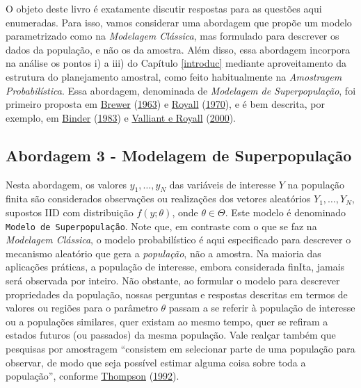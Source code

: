 \documentclass[
  12pt,
  brazilian,
]{book}
\theoremstyle{definition}
\theoremstyle{definition}
\theoremstyle{definition}
\theoremstyle{definition}
\theoremstyle{remark}
\begin{document}
O objeto deste livro é exatamente discutir respostas para as questões aqui
enumeradas. Para isso, vamos considerar uma abordagem que propõe um modelo
parametrizado como na \emph{Modelagem Clássica}, mas formulado para descrever os
dados da população, e não os da amostra. Além disso, essa abordagem incorpora na
análise os pontos i) a iii) do Capítulo \ref{introduc} mediante aproveitamento
da estrutura do planejamento amostral, como feito habitualmente na \emph{Amostragem
Probabilística}. Essa abordagem, denominada de \emph{Modelagem de Superpopulação},
foi primeiro proposta em \protect\hyperlink{ref-Brewer1963}{Brewer} (\protect\hyperlink{ref-Brewer1963}{1963}) e \protect\hyperlink{ref-royall}{Royall} (\protect\hyperlink{ref-royall}{1970}), e é bem descrita, por
exemplo, em \protect\hyperlink{ref-binder83}{Binder} (\protect\hyperlink{ref-binder83}{1983}) e \protect\hyperlink{ref-valliant}{Valliant e Royall} (\protect\hyperlink{ref-valliant}{2000}).

\hypertarget{modelsuperpop}{%
\subsection{Abordagem 3 - Modelagem de Superpopulação}\label{modelsuperpop}}

Nesta abordagem, os valores \(y_{1}, \ldots ,y_{N}\) das variáveis de interesse
\(Y\) na população finita são considerados observações ou realizações dos vetores
aleatórios \(Y_{1}, \ldots , Y_{N}\), supostos IID com distribuição \(f(y;\theta)\),
onde \(\theta \in \Theta\). Este modelo é denominado \texttt{Modelo\ de\ Superpopulação}.
Note que, em contraste com o que se faz na \emph{Modelagem Clássica}, o modelo
probabilístico é aqui especificado para descrever o mecanismo aleatório que gera
a \emph{população}, não a amostra. Na maioria das aplicações práticas, a população de
interesse, embora considerada finIta, jamais será observada por inteiro. Não
obstante, ao formular o modelo para descrever propriedades da população, nossas
perguntas e respostas descritas em termos de valores ou regiões para o parâmetro
\(\theta\) passam a se referir à população de interesse ou a populações similares,
quer existam ao mesmo tempo, quer se refiram a estados futuros (ou passados) da
mesma população. Vale realçar também que pesquisas por amostragem ``consistem em
selecionar parte de uma população para observar, de modo que seja possível
estimar alguma coisa sobre toda a população'', conforme \protect\hyperlink{ref-thompson}{Thompson} (\protect\hyperlink{ref-thompson}{1992}).
\end{document}
